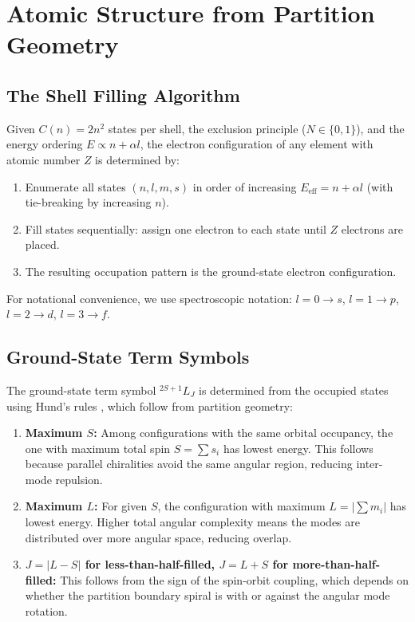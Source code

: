 \documentclass[11pt,twocolumn,a4paper]{article}
\theoremstyle{definition}
\theoremstyle{remark}
\begin{document}
\section{Atomic Structure from Partition Geometry}
\label{sec:atomic_structure}

\subsection{The Shell Filling Algorithm}

Given $C(n) = 2n^2$ states per shell, the exclusion principle ($N \in \{0, 1\}$), and the energy ordering $E \propto n + \alpha l$, the electron configuration of any element with atomic number $Z$ is determined by:

\begin{enumerate}
\item Enumerate all states $(n, l, m, s)$ in order of increasing $E_{\mathrm{eff}} = n + \alpha l$ (with tie-breaking by increasing $n$).
\item Fill states sequentially: assign one electron to each state until $Z$ electrons are placed.
\item The resulting occupation pattern is the ground-state electron configuration.
\end{enumerate}

For notational convenience, we use spectroscopic notation: $l = 0 \to s$, $l = 1 \to p$, $l = 2 \to d$, $l = 3 \to f$.

\subsection{Ground-State Term Symbols}

The ground-state term symbol ${}^{2S+1}L_J$ is determined from the occupied states using Hund's rules \citep{hund1925}, which follow from partition geometry:

\begin{enumerate}
\item \textbf{Maximum $S$:} Among configurations with the same orbital occupancy, the one with maximum total spin $S = \sum s_i$ has lowest energy. This follows because parallel chiralities avoid the same angular region, reducing inter-mode repulsion.
\item \textbf{Maximum $L$:} For given $S$, the configuration with maximum $L = |\sum m_i|$ has lowest energy. Higher total angular complexity means the modes are distributed over more angular space, reducing overlap.
\item \textbf{$J = |L - S|$ for less-than-half-filled, $J = L + S$ for more-than-half-filled:} This follows from the sign of the spin-orbit coupling, which depends on whether the partition boundary spiral is with or against the angular mode rotation.
\end{enumerate}
\end{document}
